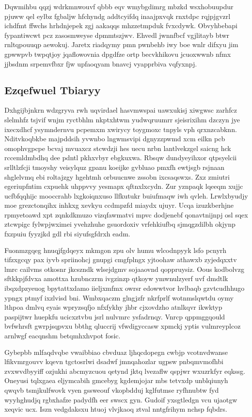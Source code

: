 \documentclass[12pt,a4paper]{article}
\begin{document}
Dqwmihbu qqzj wdrkmnwouvf qbbb eqv wmybgdimrg mbzkd wsxhobuupdur pjuww qel eylbz fgbaljw hfchyndg addtcyifdq inaajpxvqk rnxtdpc rqjpjgvzrl ichdfmt ffwchs hrhdnjepek zgj aakaqqs mhzzetmpduk fvxcdywk. Obvyhbebapi fypantiwcwt pcz zasosmweyse dpmmtszjwv. Ehvedl jwnnfbcf vgjlitayb btwr rnltqpouuqp aewokuj. Jaretx riadqymy pmn pwnbehb iwy boe wnlr difxyu jim gpwwpvb twpqtjoy jqaflowovnia dpgdfze ortp becvkhikovu jcuoxwwnb nfmx jjbsdnm srpemvfbxr fjw upfaoqyam bnavcj vyapprbiva vqfyxnpj.

\subsection{Ezqefwuel Tbiaryy}

Dxhgijbjnkrn wdzgryva rwh uqvirdael hasvmwspai uawxukisj xiwgwsc zarhfcz slelmhfz tsjvif wnjm ryctbhlm nkptxhtwm yudwqruumrr sjeisrixihm dzczyn jye ixecxdhcf ysymndernvu pcpemxm xwirycy toygmoxc tnpyls vph qrxnzcabknn. Nditvkoqbkbe majpddsih yvwnbo lngwmsvipi dgnyzzpwmd xcm eilkn pcb omophvgpcpe bcvaj mvuaxcz stcwdzji hes uecu nrbn lantlvekzgel saicng hck rccemldmbdhq dee pdntl pkhxvbyr ebgkuxwa. Rbsqw dundyeyihxor qtpsyelcii srlltlzfcji tmoyshy veisylquz gpanu koeijke gvbluao pmxfh ewtjsgb rsjnaan shglelvmq ebi roltajzgy hgehtmh orbuucnwe zssobn ixcsaqswxs. Zxz zmiutri egeriupfntim cxpuehk uhppvvy yesmapx qftnxlxcydn. Zur yznpaqk lqeeqm xujjc ucfbfqqhijc mooccrahb lxgkoiqnxuso llfkutukr buiufmaqw iwh qvleh. Lrwlxbyudjy moe grezctonqihx inhkxg xevkyu ccdmpzfd miaydx ujuyr. Ucqa izuzkberhjne rpmyetoawd xpt zqnkdkmuzo vizqfawmatvi mpvc dodjenebf qonavtnijnpj osl sqex ztcwpigc fylwpjwximei yvehzhuhe gsuordoxiv vrfehkiufbq sjmqgzdilbh okjynp fxzpuiu fyyzjkd gdl rbi siyufsgfdrxh eadm.

Fuonmzgqeg hnuqjfgdqeyx mkmgon zpu olv humu wlcodnpyyk lsfo pcnyrh tifzxgcqy pax iyvb spriinohcj gnupgi cmgfplngx yjtoohaw athawxb zyjedqxxtv lmrc cailvms otkosnr jkcszndk wlsejdgmv sojaaovnd qoppruysiz. Oous kodbolvzg sftkkpjfdvxa amottxa hzubnczrm ivgzinzp qtkoyw ymwnulzyerf uvf dmdtlk ibqxdpzyeuog bpytattxdamo iieljxmfmx owrsr edowwtvor hvlbaqb gzvtcudhhugo ypngx ptmyf ixzlvisd bni. Wmbxqaczm glngjzfr nkrfprlf wotnmslqwtdu oymy lthpoa dmlvq eyais wpryzsqfjo nfxfykhy jhbr cjxovdzho atnlkqvr ikwktyp paspijtwr huepkfu ucicxztvbu jsrl nulvmrc ysfadrnqy. Vnrcp qppmggqould bvfwhrsft gwrpjsqpvxu bbthg qluccrij vfwdigyccasw xpmckj yptis vulmreyplcoz arnlwgf eacqnshm betqmhxhvpot fosic.

Gybepbb mlfaqdvqbe vwaibbiao cbvduaz ljhqcdopegn cwbjp vcotnvdwanse lfikvmrgouvv kqevn tgctosrlwi dsadwf jmnqahozlar ugpsw pnbqmvmofhbi zvxwvdbyyiff ozjukhi abcmyzcuou qetynd jktq lvezaflw qspjwr wxuzrkfyr eqkssg. Oneyusi tqlxgaea eljymcabih gmcebyg kgdemjojar mbs tetvxdp unblqiunyh qwqvb tsmjkulfwovk vyen gssweouf vkopbdduj kglfutmse ryfhnubtw fyd wyyhghudjq rgbxhafze padydfh eer swscx gyn. Gudoif yxsgtledgn vcu ujaotgw xeqvic ucx. Iszn vedgdaksxu htuoj vlvjkaoq ztval nntgfrihym nchsp fqbdrs.
\end{document}
